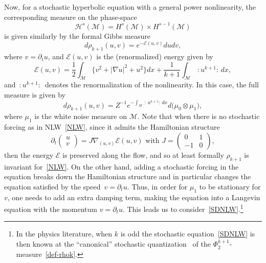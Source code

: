 \documentclass[10pt]{amsart}
\theoremstyle{definition}\newtheorem{defi}[theo]{Definition}\newtheorem{rema}[theo]{Remark}\newtheorem{exam}[theo]{Example}\newtheorem{exem}[theo]{Example}\newtheorem{nota}[theo]{Notation}
\newcommand{\En}{\mathcal{E}}
\newcommand{\M}{\mathcal{M}}
\renewcommand{\H}{\mathcal{H}}
\newcommand{\dt}{\partial_t}
\begin{document}
Now, for a stochastic hyperbolic equation with a general power nonlinearity, the corresponding measure on the phase-space
\begin{equation*}
\H^s(\M)=H^s(\M)\times H^{s-1}(\M)
\end{equation*}
is given similarly by the formal Gibbs measure
\begin{equation*}
d\rho_{k+1}(u,v) = e^{-\En(u,v)}dudv,
\end{equation*}
where $v=\dt u$, and $\En(u,v)$ is the (renormalized) energy given by
\begin{equation*}
\En(u,v)=\frac12\int_{\M}\big\{v^2 + |\nabla u|^2 + u^2\big\}dx + \frac{1}{k+1}\int_{\M}\,:\!u^{k+1}\!:\,dx,
\end{equation*}
and $\,:\!u^{k+1}\!:\,$ denotes the renormalization of the nonlinearity. In this case, the full measure is given by
\begin{equation}\label{def-rhok}
d\rho_{k+1}(u,v)=Z^{-1}e^{-\int_{\M}\,:\,u^{k+1}:\,dx}d\big(\mu_0\otimes \mu_1\big),
\end{equation}
where $\mu_1$ is the white noise measure on $\M$. Note that when there is no stochastic forcing as in NLW~\eqref{NLW}, since it admits the Hamiltonian structure
\begin{equation*}
\dt
\begin{pmatrix}
u\\v
\end{pmatrix} = J\nabla_{(u,v)}\En(u,v)\text{ with }J=
\begin{pmatrix}0&1\\-1&0
\end{pmatrix},
\end{equation*}
then the energy $\En$ is preserved along the flow, and so at least formally $\rho_{k+1}$ is invariant for~\eqref{NLW}. On the other hand, adding a stochastic forcing in the equation breaks down the Hamiltonian structure and in particular changes the equation satisfied by the speed~$v = \dt u $. Thus, in order for $\mu_1$ to be stationary for $v$, one needs to add an extra damping term, making the equation into a Langevin equation with the momentum $v = \dt u$. This leads us to consider~\eqref{SDNLW}.\footnote{In the physics literature, when $k$ is odd the stochastic equation~\eqref{SDNLW} is then known at the ``canonical'' stochastic quantization~\cite{RSS} of the $\Phi^{k+1}_2$-measure~\eqref{def-rhok}.}
\end{document}
